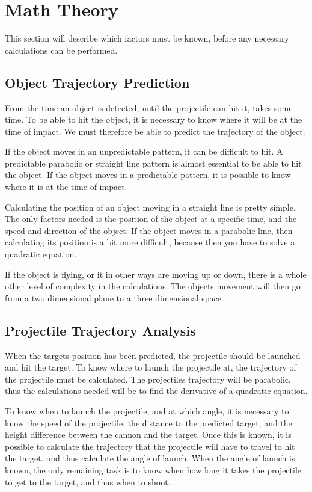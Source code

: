 \section{Math Theory}
This section will describe which factors must be known, before any necessary calculations can be performed.

\subsection{Object Trajectory Prediction}
From the time an object is detected, until the projectile can hit it, takes some time. To be able to hit the object, it is necessary to know where it will be at the time of impact. We must therefore be able to predict the trajectory of the object.

If the object moves in an unpredictable pattern, it can be difficult to hit. A predictable parabolic or straight line pattern is almost essential to be able to hit the object. If the object moves in a predictable pattern, it is possible to know where it is at the time of impact.

Calculating the position of an object moving in a straight line is pretty simple. The only factors needed is the position of the object at a specific time, and the speed and direction of the object. If the object moves in a parabolic line, then calculating its position is a bit more difficult, because then you have to solve a quadratic equation.

If the object is flying, or it in other ways are moving up or down, there is a whole other level of complexity in the calculations. The objects movement will then go from a two dimensional plane to a three dimensional space.

\subsection{Projectile Trajectory Analysis}
When the targets position has been predicted, the projectile should be launched and hit the target. To know where to launch the projectile at, the trajectory of the projectile must be calculated.
The projectiles trajectory will be parabolic, thus the calculations needed will be to find the derivative of a quadratic equation.

To know when to launch the projectile, and at which angle, it is necessary to know the speed of the projectile, the distance to the predicted target, and the height difference between the cannon and the target. Once this is known, it is possible to calculate the trajectory that the projectile will have to travel to hit the target, and thus calculate the angle of launch.
When the angle of launch is known, the only remaining task is to know when how long it takes the projectile to get to the target, and thus when to shoot.

